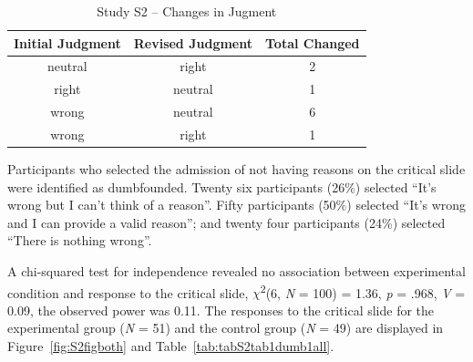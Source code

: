 \documentclass[
  man,floatsintext]{apa6}
\begin{document}
\begin{table}[tbp]

\begin{center}
\begin{threeparttable}

\caption{\label{tab:tabS2change}Study S2 – Changes in Jugment}

\begin{tabular}{ccc}
\toprule
Initial Judgment & \multicolumn{1}{c}{Revised Judgment} & \multicolumn{1}{c}{Total Changed}\\
\midrule
neutral & right & 2\\
right & neutral & 1\\
wrong & neutral & 6\\
wrong & right & 1\\
\bottomrule
\end{tabular}

\end{threeparttable}
\end{center}

\end{table}

Participants who selected the admission of not having reasons on the critical slide were identified as dumbfounded. Twenty six participants (26\%) selected ``It's wrong but I can't think of a reason''. Fifty participants (50\%) selected ``It's wrong and I can provide a valid reason''; and twenty four participants (24\%) selected ``There is nothing wrong''.

A chi-squared test for independence revealed no association between experimental condition and response to the critical slide, \(\chi\)\textsuperscript{2}(6, \emph{N} = 100) = 1.36, \emph{p} = .968, \emph{V} = 0.09, the observed power was 0.11. The responses to the critical slide for the experimental group (\emph{N} = 51) and the control group (\emph{N} = 49) are displayed in Figure~\ref{fig:S2figboth} and Table~\ref{tab:tabS2tab1dumb1all}.
\end{document}
